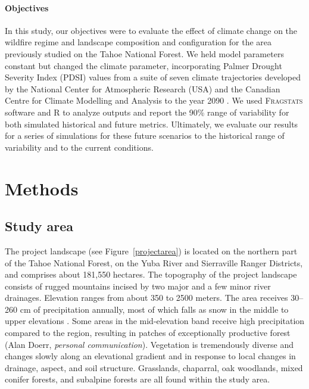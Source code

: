 \documentclass[12pt]{article}
\begin{document}
\begin{spacing}{1}
\paragraph{Objectives}
In this study, our objectives were to evaluate the effect of climate change on the wildfire regime and landscape composition and configuration for the area previously studied on the Tahoe National Forest. We held model parameters constant but changed the climate parameter, incorporating Palmer Drought Severity Index (PDSI) values from a suite of seven climate trajectories developed by the National Center for Atmospheric Research (USA) and the Canadian Centre for Climate Modelling and Analysis to the year 2090 \citep{Cook2014}. We used \textsc{Fragstats} software and R to analyze outputs and report the 90\% range of variability for both simulated historical and future metrics. Ultimately, we evaluate our results for a series of simulations for these future scenarios to the historical range of variability and to the current conditions. 


\section*{Methods}

\subsection*{Study area}
The project landscape (see Figure~\ref{projectarea}) is located on the northern part of the Tahoe National Forest, on the Yuba River and Sierraville Ranger Districts, and comprises about 181,550 hectares. The topography of the project landscape consists of rugged mountains incised by two major and a few minor river drainages. Elevation ranges from about 350 to 2500 meters. The area receives 30--260 cm of precipitation annually, most of which falls as snow in the middle to upper elevations \citep{Storer1963}. Some areas in the mid-elevation band receive high precipitation compared to the region, resulting in patches of exceptionally productive forest (Alan Doerr, \emph{personal communication}). Vegetation is tremendously diverse and changes slowly along an elevational gradient and in response to local changes in drainage, aspect, and soil structure. Grasslands, chaparral, oak woodlands, mixed conifer forests, and subalpine forests are all found within the study area. 


\end{spacing}
\end{document}

